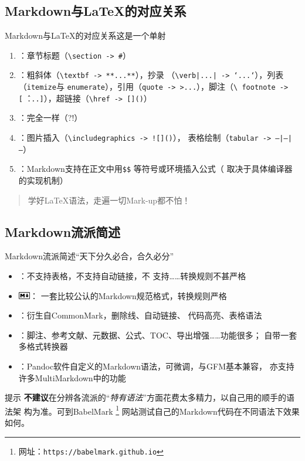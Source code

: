 \documentclass[10pt]{beamer}
\begin{document}
\subsection{Markdown与\LaTeX{}的对应关系}
\begin{frame}{Markdown与\LaTeX{}的对应关系}{这是一个单射}
\begin{enumerate}
    \item {}：章节标题（\texttt{\textbackslash{}section -> \#}）
    \item {}：粗斜体（\texttt{\textbackslash{}textbf -> **...**}），抄录
    （\texttt{\textbackslash{}verb|...| -> `...`}），列表（\texttt{itemize}与
    \texttt{enumerate}），引用（\texttt{quote -> >...}），脚注（\texttt{\textbackslash{}
    footnote -> [\^\ ...]}），超链接（\texttt{\textbackslash{}href -> []()}）
    \item {}：完全一样（?!）
    \item {}：图片插入（\texttt{\textbackslash{}includegraphics -> ![]()}），
    表格绘制（\texttt{tabular -> ---|---|---}）
    \item {}：Markdown支持在正文中用\texttt{\$\$} 等符号或环境插入公式（
    取决于具体编译器的实现机制）
\end{enumerate}

\begin{quotation}
学好\LaTeX{}语法，走遍一切Mark-up都不怕！
\end{quotation}
\end{frame}

\subsection{Markdown流派简述}
\begin{frame}{Markdown流派简述}{“天下分久必合，合久必分”}
\begin{itemize}
    \item {}：不支持表格，不支持自动链接，不
    支持……转换规则不甚严格
    \item {} \includegraphics[width=0.04\textwidth]{pic/Markdown.png}：
    一套比较公认的Markdown规范格式，转换规则严格
    \item {}：衍生自CommonMark，删除线、自动链接、
    代码高亮、表格语法
    \item {}：脚注、参考文献、元数据、公式、TOC、导出增强……功能很多；
    自带一套多格式转换器
    \item {}：Pandoc软件自定义的Markdown语法，可微调，与GFM基本兼容，
    亦支持许多MultiMarkdown中的功能
\end{itemize}

\begin{block}{提示}
\textbf{不建议}在分辨各流派的“\textit{特有语法}”方面花费太多精力，以自己用的顺手的语法架
构为准。可到BabelMark
\footnote{网址：\texttt{https://babelmark.github.io}}
网站测试自己的Markdown代码在不同语法下效果如何。
\end{block}
\end{frame}
\end{document}
